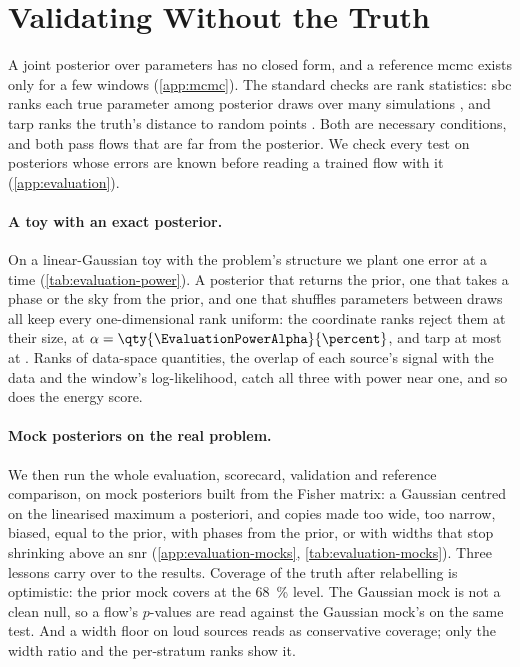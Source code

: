 \section{Validating Without the Truth}
\label{sec:validation}

A joint posterior over \RelatedWorkParameters{} parameters has no closed form, and a reference
\ac{mcmc} exists only for a few windows (\cref{app:mcmc}). The standard checks are rank
statistics: \ac{sbc} ranks each true parameter among posterior draws over many simulations
\citep{talts2018validating,modrak2023simulation}, and \ac{tarp} ranks the truth's distance to
random points \citep{lemos2023sampling}. Both are necessary conditions, and both pass flows that
are far from the posterior. We check every test on posteriors whose errors are known before
reading a trained flow with it (\cref{app:evaluation}).

\paragraph{A toy with an exact posterior.} On a linear-Gaussian toy with the problem's structure we
plant one error at a time (\cref{tab:evaluation-power}). A posterior that returns the prior, one
that takes a phase or the sky from the prior, and one that shuffles parameters between draws all
keep every one-dimensional rank uniform: the coordinate ranks reject them at their size,
\EvaluationPowerPhaseCoord{} at $\alpha=\qty{\EvaluationPowerAlpha}{\percent}$, and \ac{tarp}
at most at \EvaluationPowerTarpBlind. Ranks of data-space quantities, the overlap of each source's
signal with the data and the window's log-likelihood, catch all three with power near one, and so
does the energy score.

\paragraph{Mock posteriors on the real problem.} We then run the whole evaluation, scorecard,
validation and reference comparison, on mock posteriors built from the Fisher matrix: a Gaussian
centred on the linearised maximum a posteriori, and copies made too wide, too narrow, biased,
equal to the prior, with phases from the prior, or with widths that stop shrinking above an
\ac{snr} (\cref{app:evaluation-mocks}, \cref{tab:evaluation-mocks}). Three lessons carry over to
the results. Coverage of the truth after relabelling is optimistic: the prior mock covers
\EvaluationMockPriorCover{} at the \qty{68}{\percent} level. The Gaussian mock is not a clean null,
so a flow's $p$-values are read against the Gaussian mock's on the same test. And a width floor on
loud sources reads as conservative coverage; only the width ratio and the per-stratum ranks show it.

